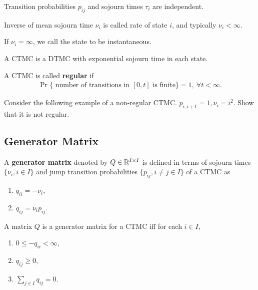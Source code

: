 \documentclass[a4paper,10pt,english]{article}
\begin{document}
\begin{rem}
Transition probabilities $p_{ij}$ and sojourn times $\tau_i$ are independent. 
\end{rem}
\begin{rem} Inverse of mean sojourn time $\nu_i$ is called rate of state $i$, and typically $\nu_i < \infty$.  
\end{rem}
\begin{rem} If $\nu_i = \infty$, we call the state to be instantaneous. 
\end{rem}
\begin{rem}  A CTMC is a DTMC with exponential sojourn time in each state.
\end{rem}
\begin{defn} A CTMC is called \textbf{regular} if 
\begin{align*}
\Pr\{ \text{ number of transitions in } [0,t] \text{ is finite}\} = 1,~ \forall t < \infty.
\end{align*} 
\end{defn}
\begin{exmp} Consider the following example of a non-regular CTMC. $p_{i,i+1}=1, \nu_i = i^2$. Show that it is not regular.
\end{exmp}

\subsection{Generator Matrix}
A \textbf{generator matrix} denoted by $Q \in \mathbb{R}^{I \times I}$ is defined in terms of sojourn times $\{\nu_i, i \in I\}$ and jump transition probabilities $\{p_{ij}, i \neq j \in I\}$ of a CTMC as
\begin{enumerate}
\item $q_{ii}= -\nu_i$,
\item $q_{ij}=\nu_i p_{ij}$. 
\end{enumerate}
\begin{lem} A matrix $Q$ is a generator matrix for a CTMC iff for each $i \in I$,
 \begin{enumerate}
\item $0 \leq -q_{ii} < \infty$, 
\item $q_{ij} \geq 0$,
\item $\sum_{j \in I}q_{ij}=0$.
\end{enumerate}
\end{lem}
\end{document}
